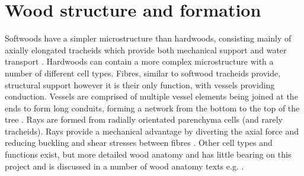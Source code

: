 \section{Wood structure and formation}
Softwoods have a simpler microstructure than hardwoods, consisting mainly of
axially elongated tracheids which provide both mechanical support and water
transport \cite{bowyer2007forest}. Hardwoods can contain a more complex microstructure with a number
of different cell types. Fibres, similar to softwood tracheids provide,
structural support however it is their only function, with vessels providing
conduction. Vessels are comprised of
multiple vessel elements being joined at the ends to form long conduits,
forming a network from the bottom to  the top of the tree \cite{walker1993primary}. Rays are formed from radially orientated  parenchyma cells (and rarely tracheids). Rays provide a mechanical advantage by diverting the axial force and reducing buckling and shear stresses between fibres \cite{mattheck1997wood}. Other cell types and functions exist, but more detailed wood anatomy and
has little bearing on this project and is discussed in a number of wood anatomy
texts e.g. \cite{fromm2013cellular}.